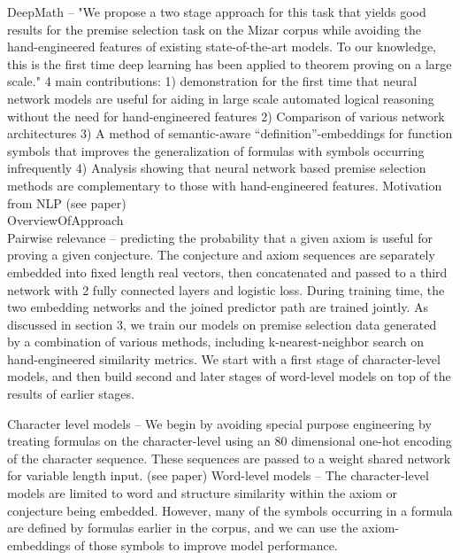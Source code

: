 \documentclass{article}
\begin{document}
DeepMath \cite{DeepMath} --  "We propose a two stage approach for this task
that yields good results for the premise selection task on the Mizar corpus
while avoiding the hand-engineered features of existing state-of-the-art
models. To our knowledge, this is the first time deep learning has been applied
to theorem proving on a large scale." 4 main contributions: 1) demonstration
for the first time that neural network models are useful for aiding in large
scale automated logical reasoning without the need for hand-engineered features
2) Comparison of various network architectures 3) A method of semantic-aware
“definition”-embeddings for function symbols that improves the generalization
of formulas with symbols occurring infrequently 4) Analysis showing that neural
network based premise selection methods are complementary to those with
hand-engineered features. Motivation from NLP (see paper)\\
OverviewOfApproach\\
Pairwise relevance -- predicting the probability that a given axiom is useful
for proving a given conjecture. The conjecture and axiom sequences are
separately embedded into fixed length real vectors, then concatenated and
passed to a third network with 2 fully connected layers and logistic loss.
During training time, the two embedding networks and the joined predictor path
are trained jointly. As discussed in section 3, we train our models on premise
selection data generated by a combination of various methods, including
k-nearest-neighbor search on hand-engineered similarity metrics. We start with
a first stage of character-level models, and then build second and later stages
of word-level models on top of the results of earlier stages.

Character level models -- We begin by avoiding special purpose engineering by
treating formulas on the character-level using an 80 dimensional one-hot
encoding of the character sequence. These sequences are passed to a weight
shared network for variable length input. (see paper)
Word-level models -- The character-level models are limited to word and
structure similarity within the axiom or conjecture being embedded.  However,
many of the symbols occurring in a formula are defined by formulas earlier in
the corpus, and we can use the axiom-embeddings of those symbols to improve
model performance.



\end{document}
